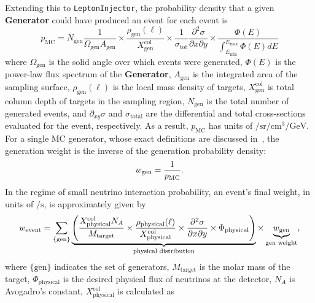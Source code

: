 \documentclass[main.tex]{subfiles}
\newcommand{\LeptonInjector}{\texttt{LeptonInjector}}
\begin{document}
Extending this to \LeptonInjector{}, the probability density that a given \textbf{Generator} could have produced an event for each event is
\begin{equation}
p_\mathrm{MC} = N_\textrm{gen}\frac{1}{\Omega_\mathrm{gen} A_\mathrm{gen}} \times
\frac{\rho_\textrm{gen}(\ell)}{X_\textrm{gen}^\textrm{col}} \times \frac{1}{\sigma_\mathrm{tot}}\frac{\partial^2\sigma}{\partial x\partial y}\times \frac{\Phi(E)}{\int_{E_\mathrm{min}}^{E_\mathrm{max}}\Phi(E) dE}
\end{equation}
where $\Omega_{\mathrm{gen}}$ is the solid angle over which events were generated, $\Phi(E)$ is the power-law flux spectrum of the \textbf{Generator}, $A_{\mathrm{gen}}$ is the integrated area of the sampling surface, $\rho_\textrm{gen}(\ell)$ is the local mass density of targets, $X_\textrm{gen}^\mathrm{col}$ is total column depth of targets in the sampling region, $N_{\textrm{gen}}$ is the total number of generated events, and $\partial_{xy}\sigma$ and $\sigma_{\mathrm{total}}$ are the differential and total cross-sections evaluated for the event, respectively.
As a result, $p_{\mathrm{MC}}$ has units of $\si{\per\steradian\per\cubic\cm\per\GeV}$.
For a single MC generator, whose exact definitions are discussed in~\cite{Gainer:2014}, the generation weight is the inverse of the generation probability density:
\begin{equation}
w_{\rm gen} = \frac{1}{p_{\mathrm{MC}}}.
\end{equation}
In the regime of small neutrino interaction probability, an event's final weight, in units of $\si{\per\s}$, is approximately given by
\begin{equation}
w_{\rm event} = \sum\limits_{\lbrace \textrm{gen}\rbrace} \underbrace{\left( \frac{X_\textrm{physical}^\mathrm{col} N_{A}}{M_\textrm{target}} \times \frac{\rho_\textrm{physical}(\ell)}{X_\textrm{physical}^\textrm{col}} \times \frac{\partial^2\sigma}{\partial x \partial y} \times\Phi_{\mathrm{physical}} \right) }_{\text{physical distribution}} \times \underbrace{ w_{\mathrm{gen}}}_{\text{gen weight}},
\label{eq:approx_weight}
\end{equation}
where $\{\textrm{gen}\}$ indicates the set of generators, $M_\textrm{target}$ is the molar mass of the target, $\Phi_{\mathrm{physical}}$ is the desired physical flux of neutrinos at the detector, $N_A$ is Avogadro's constant, $X_\textrm{physical}^\textrm{col}$ is calculated as
\end{document}
